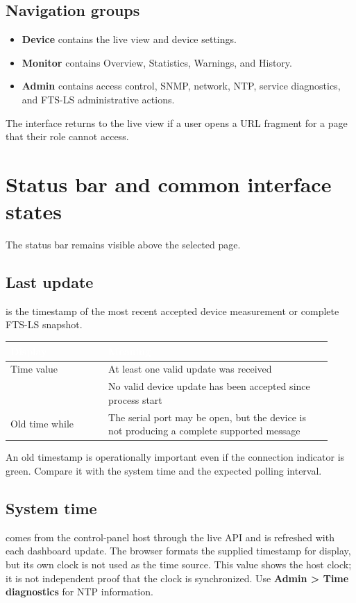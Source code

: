 \documentclass[11pt,a4paper,oneside]{book}
\newcommand{\thead}[1]{\cellcolor{panelblue}\textcolor{white}{\textbf{#1}}}
\DeclareRobustCommand{\code}[1]{\texttt{\detokenize{#1}}}
\begin{document}
\section{Navigation groups}
\begin{itemize}
\item \textbf{Device} contains the live view and device settings.
\item \textbf{Monitor} contains Overview, Statistics, Warnings, and History.
\item \textbf{Admin} contains access control, SNMP, network, NTP, service diagnostics, and FTS-LS administrative actions.
\end{itemize}

The interface returns to the live view if a user opens a URL fragment for a page that their role cannot access.

\chapter{Status bar and common interface states}
The status bar remains visible above the selected page.

\section{Last update}
\code{Last update} is the timestamp of the most recent accepted device measurement or complete FTS-LS snapshot.

\begin{longtable}{|>{\centering\arraybackslash}m{0.28\linewidth}|>{\centering\arraybackslash}m{0.64\linewidth}|}
\hline
\thead{Display} & \thead{Meaning} \\
\hline
\endhead
Time value & At least one valid update was received \\
\hline
\code{--} & No valid device update has been accepted since process start \\
\hline
Old time while \code{CONNECTED} & The serial port may be open, but the device is not producing a complete supported message \\
\hline
\end{longtable}
An old timestamp is operationally important even if the connection indicator is green. Compare it with the system time and the expected polling interval.

\section{System time}
\code{System time} comes from the control-panel host through the live API and is
refreshed with each dashboard update. The browser formats the supplied timestamp
for display, but its own clock is not used as the time source. This value shows the
host clock; it is not independent proof that the clock is synchronized. Use
\textbf{Admin > Time diagnostics} for NTP information.
\end{document}
